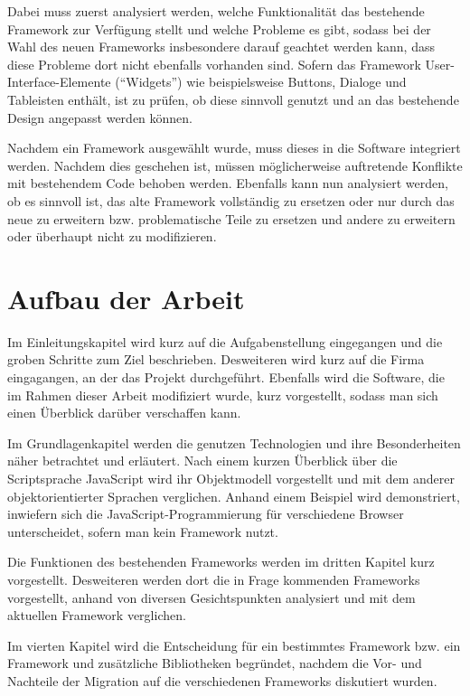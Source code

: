 Dabei muss zuerst analysiert werden, welche Funktionalität das bestehende Framework zur Verfügung
stellt und welche Probleme es gibt, sodass bei der Wahl des neuen Frameworks insbesondere darauf
geachtet werden kann, dass diese Probleme dort nicht ebenfalls vorhanden sind. Sofern das Framework
User-Interface-Elemente (\enquote{Widgets}) wie beispielsweise Buttons, Dialoge und Tableisten
enthält, ist zu prüfen, ob diese sinnvoll genutzt und an das bestehende Design angepasst werden können.

Nachdem ein Framework ausgewählt wurde, muss dieses in die Software integriert werden. Nachdem dies
geschehen ist, müssen möglicherweise auftretende Konflikte mit bestehendem Code behoben werden.
Ebenfalls kann nun analysiert werden, ob es sinnvoll ist, das alte Framework vollständig zu ersetzen
oder nur durch das neue zu erweitern bzw. problematische Teile zu ersetzen und andere zu erweitern
oder überhaupt nicht zu modifizieren.


\section{Aufbau der Arbeit}

Im Einleitungskapitel wird kurz auf die Aufgabenstellung eingegangen und die groben Schritte zum
Ziel beschrieben. Desweiteren wird kurz auf die Firma eingagangen, an der das Projekt durchgeführt.
Ebenfalls wird die Software, die im Rahmen dieser Arbeit modifiziert wurde, kurz vorgestellt, sodass
man sich einen Überblick darüber verschaffen kann.

Im Grundlagenkapitel werden die genutzen Technologien und ihre Besonderheiten näher betrachtet und
erläutert. Nach einem kurzen Überblick über die Scriptsprache JavaScript wird ihr Objektmodell
vorgestellt und mit dem anderer objektorientierter Sprachen verglichen. Anhand einem Beispiel wird
demonstriert, inwiefern sich die JavaScript-Programmierung für verschiedene Browser unterscheidet,
sofern man kein Framework nutzt.

Die Funktionen des bestehenden Frameworks werden im dritten Kapitel kurz vorgestellt. Desweiteren
werden dort die in Frage kommenden Frameworks vorgestellt, anhand von diversen Gesichtspunkten
analysiert und mit dem aktuellen Framework verglichen.

Im vierten Kapitel wird die Entscheidung für ein bestimmtes Framework bzw. ein Framework und
zusätzliche Bibliotheken begründet, nachdem die Vor- und Nachteile der Migration auf die
verschiedenen Frameworks diskutiert wurden.


